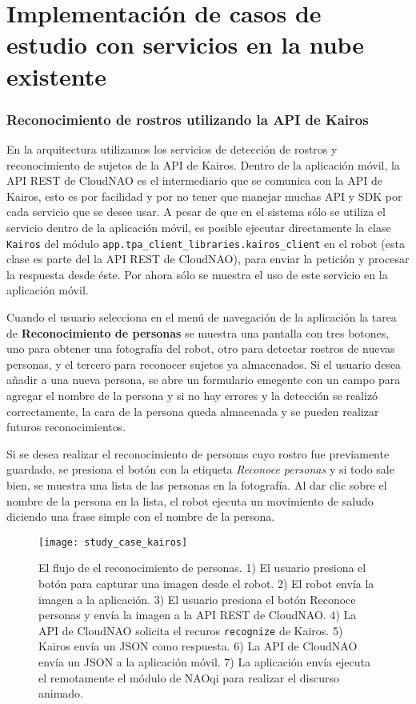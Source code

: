 
\section{Implementación de casos de estudio con servicios en la nube existente}
\label{\detokenize{chapter_two/study_cases_implementation:implementacion-de-casos-de-estudio-con-servicios-en-la-nube-existente}}\label{\detokenize{chapter_two/study_cases_implementation::doc}}


\subsubsection{Reconocimiento de rostros utilizando la API de Kairos}

En la arquitectura utilizamos los servicios de detección de rostros y reconocimiento
de sujetos de la API de Kairos.
Dentro de la aplicación móvil, la API REST de CloudNAO es el intermediario
que se comunica con la API de Kairos, esto es por facilidad y por no
tener que manejar muchas API y SDK por cada servicio que se desee usar.
A pesar de que en el sistema sólo se utiliza el servicio
dentro de la aplicación móvil, es posible ejecutar directamente la clase
\texttt{Kairos} del módulo \texttt{app.tpa\_client\_libraries.kairos\_client}
en el robot (esta clase es parte del la API REST de CloudNAO), para enviar la petición y procesar la respuesta desde éste.
Por ahora sólo se muestra el uso de este servicio en la aplicación móvil.

Cuando el usuario selecciona en el menú de navegación de la aplicación
la tarea de \textbf{Reconocimiento de personas} se muestra una pantalla 
con tres botones, uno para obtener una fotografía del robot, otro para
detectar rostros de nuevas personas, y el tercero para reconocer sujetos
ya almacenados. Si el usuario desea añadir a una nueva persona, se abre un
formulario emegente con un campo para agregar el nombre de la persona y
si no hay errores y la detección se realizó correctamente,
la cara de la persona queda almacenada y se pueden realizar futuros reconocimientos.

Si se desea realizar el reconocimiento de personas cuyo rostro
fue previamente guardado, se presiona el botón con la etiqueta
\textit{Reconoce personas} y si todo sale bien,
se muestra una lista de las personas en la fotografía.
Al dar clic sobre el nombre de la persona en la lista, el robot ejecuta
un movimiento de saludo diciendo una frase simple con el nombre de la persona.

\begin{figure}[!h]
\centering
\caption{El flujo de el reconocimiento de personas. 1) El usuario presiona el botón para capturar una imagen desde el robot. 2) El robot envía la imagen a la 
aplicación. 3) El usuario presiona el botón Reconoce personas y envía la imagen a la API REST de CloudNAO. 4) La API de CloudNAO solicita el recuros \texttt{recognize} de Kairos. 5) Kairos envía un JSON como respuesta. 6) La API 
de CloudNAO envía un JSON a la aplicación móvil. 7) La aplicación envía ejecuta el remotamente el módulo de NAOqi para realizar el discurso animado.}
\texttt{[image: study\_case\_kairos]}
\end{figure}

